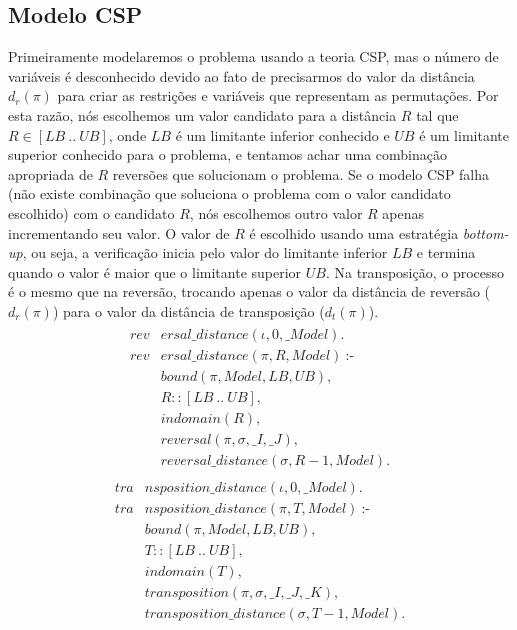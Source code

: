 \subsection{Modelo CSP}
\label{subsec:modelcsp}
Primeiramente modelaremos o problema usando a teoria CSP, mas o número
de variáveis é desconhecido devido ao fato de precisarmos do valor da
distância $d_{r}(\pi)$ para criar as restrições e variáveis que
representam as permutações. Por esta razão, nós escolhemos um valor
candidato para a distância $R$ tal que $R \in [LB~..~UB]$, onde $LB$ é
um limitante inferior conhecido e $UB$ é um limitante superior
conhecido para o problema, e tentamos achar uma combinação apropriada
de $R$ reversões que solucionam o problema. Se o modelo CSP falha (não
existe combinação que soluciona o problema com o valor candidato
escolhido) com o candidato $R$, nós escolhemos outro valor $R$ apenas
incrementando seu valor. O valor de $R$ é escolhido usando uma
estratégia \textit{bottom-up}, ou seja, a verificação inicia pelo
valor do limitante inferior $LB$ e termina quando o valor é maior que o
limitante superior $UB$. Na transposição, o processo é o mesmo que na
reversão, trocando apenas o valor da distância de reversão
($d_{r}(\pi)$) para o valor da distância de transposição
($d_{t}(\pi)$).
\begin{align}
  \label{revdistance}
  \begin{split}
  \textit{rev}&\textit{ersal\_distance}(\iota, 0, \_Model). \\
  \textit{rev}&\textit{ersal\_distance}(\pi, R, Model)~\text{:-} \\
  &\textit{bound}(\pi, Model, LB, UB), \\
  &R :: [LB~..~UB], \\
  &\textit{indomain}(R),  \\
  &\textit{reversal}(\pi, \sigma, \_I, \_J),  \\
  &\textit{reversal\_distance}(\sigma, R-1, Model). 
  \end{split}
\end{align}
\begin{align}
  \label{tradistance}
  \begin{split}
  \textit{tra}&\textit{nsposition\_distance}(\iota, 0, \_Model). \\
  \textit{tra}&\textit{nsposition\_distance}(\pi, T, Model)~\text{:-} \\
  &\textit{bound}(\pi, Model, LB, UB), \\
  &T :: [LB~..~UB], \\
  &\textit{indomain}(T),  \\
  &\textit{transposition}(\pi, \sigma, \_I, \_J, \_K),  \\
  &\textit{transposition\_distance}(\sigma, T-1, Model). 
  \end{split}
\end{align}

